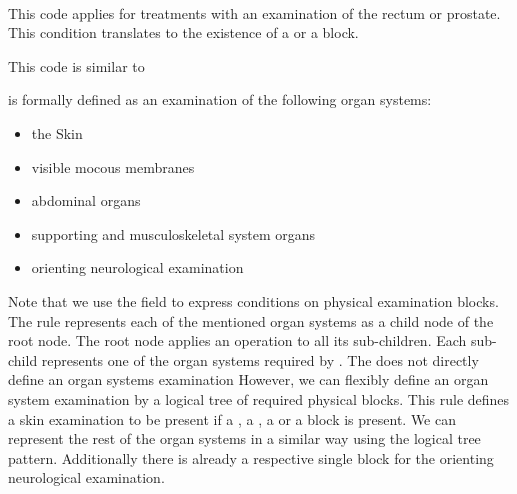 

\paragraph{}
This code applies for treatments with an examination of the rectum or prostate.
This condition translates to the existence of a  or a  block.







This code is similar to






 is formally defined as an examination of the following organ systems:
\begin{itemize}
    \item the Skin
    \item visible mocous membranes
    \item abdominal organs
    \item supporting and musculoskeletal system organs
    \item orienting neurological examination
\end{itemize}

Note that we use the  field to express conditions on physical examination blocks.
The rule represents each of the mentioned organ systems as a child node of the root node.
The root node applies an  operation to all its sub-children.
Each sub-child represents one of the organ systems required by .
The \AVS does not directly define an organ systems examination
However, we can flexibly define an organ system examination by a logical tree of required physical blocks.
This rule defines a skin examination to be present if a , a , a  or a  block is present.
We can represent the rest of the organ systems in a similar way using the logical tree pattern.
Additionally there is already a respective single block for the orienting neurological examination.

